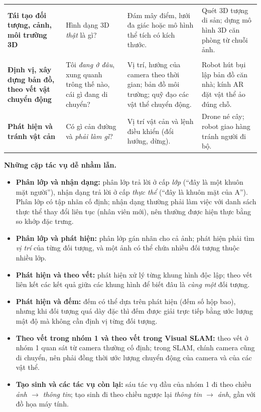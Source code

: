 \begin{table}[ht]
\begin{tabularx}{\textwidth}{|>{\raggedright\arraybackslash}p{2.1cm}|>{\raggedright\arraybackslash}p{2.6cm}|>{\raggedright\arraybackslash}X|>{\raggedright\arraybackslash}X|}
\hline
\multicolumn{4}{|l|}{\textbf{Nhóm 2: Tái tạo 3D (3D Reconstruction)}} \\
\hline
\textbf{Tái tạo đối tượng, cảnh, môi trường 3D} & Hình dạng 3D \emph{thật} là gì? & Đám mây điểm, lưới đa giác hoặc mô hình thể tích có kích thước. & Quét 3D tượng di sản; dựng mô hình 3D căn phòng từ chuỗi ảnh. \\
\hline
\multicolumn{4}{|l|}{\textbf{Nhóm 3: Visual SLAM}} \\
\hline
\textbf{Định vị, xây dựng bản đồ, theo vết vật chuyển động} & Tôi \emph{đang ở đâu}, xung quanh trông thế nào, cái gì đang di chuyển? & Vị trí, hướng của camera theo thời gian; bản đồ môi trường; quỹ đạo các vật thể chuyển động. & Robot hút bụi lập bản đồ căn nhà; kính AR đặt vật thể ảo đúng chỗ. \\
\hline
\textbf{Phát hiện và tránh vật cản} & Có gì cản đường và \emph{phải làm gì}? & Vị trí vật cản và lệnh điều khiển (đổi hướng, dừng). & Drone né cây; robot giao hàng tránh người đi bộ. \\
\hline
\end{tabularx}
\end{table}

\textbf{Những cặp tác vụ dễ nhầm lẫn.}
\begin{itemize}
    \item \textbf{Phân lớp và nhận dạng:} phân lớp trả lời ở cấp \emph{lớp} (``đây là một khuôn mặt người''), nhận dạng trả lời ở cấp \emph{thực thể} (``đây là khuôn mặt của A''). Phân lớp có tập nhãn cố định; nhận dạng thường phải làm việc với danh sách thực thể thay đổi liên tục (nhân viên mới), nên thường được hiện thực bằng so khớp đặc trưng.
    \item \textbf{Phân lớp và phát hiện:} phân lớp gán nhãn cho cả ảnh; phát hiện phải tìm \emph{vị trí} của từng đối tượng, và một ảnh có thể chứa nhiều đối tượng thuộc nhiều lớp.
    \item \textbf{Phát hiện và theo vết:} phát hiện xử lý từng khung hình độc lập; theo vết liên kết các kết quả giữa các khung hình để biết đâu là \emph{cùng một} đối tượng.
    \item \textbf{Phát hiện và đếm:} đếm có thể dựa trên phát hiện (đếm số hộp bao), nhưng khi đối tượng quá dày đặc thì đếm được giải trực tiếp bằng ước lượng mật độ mà không cần định vị từng đối tượng.
    \item \textbf{Theo vết trong nhóm 1 và theo vết trong Visual SLAM:} theo vết ở nhóm 1 quan sát từ camera thường cố định; trong SLAM, chính camera cũng di chuyển, nên phải đồng thời ước lượng chuyển động của camera và của các vật thể.
    \item \textbf{Tạo sinh và các tác vụ còn lại:} sáu tác vụ đầu của nhóm 1 đi theo chiều \emph{ảnh $\rightarrow$ thông tin}; tạo sinh đi theo chiều ngược lại \emph{thông tin $\rightarrow$ ảnh}, gần với đồ họa máy tính.
\end{itemize}


